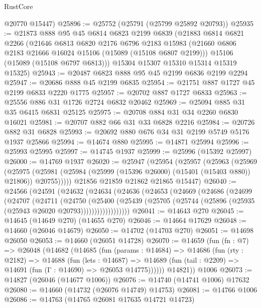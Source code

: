 \begin{lexlean}{RustCore}
\begin{coremodule}
      @20770
      @15447)
@25896 := @25752 (@25791 (@25799 @25892 @20793))
@25935 := @21873
    @888
    @95
    @45
    @6814
    @6823
    @2199
    @6839
    (@21883
      @6814
      @6821
      @2266
      (@21646
        @6813
        @6820
        @2176
        @6796
        @2183
        @15983
        (@21660 @6806 @2183 @21666 @16024 @15106 (@15089 (@15108 @6807 @2199)))
        @15106
        (@15089 (@15108 @6797 @6813)))
      @15304
      @15307
      @15310
      @15314
      @15319
      @15325)
@25943 := @20487 @6823 @888 @95 @45 @2199 @6836 @2199 @2294
@25947 := @20686 @888 @45 @2199 @6835
@25954 := @21751 @887 @1727 @45 @2199 @6833 @2220 @1775
@25957 := @20702 @887 @1727 @6833
@25963 := @25556 @886 @31 @1726 @2724 @6832 @20462
@25969 := @25094 @885 @31 @35 @6415 @6831 @25125
@25975 := @20708 @884 @31 @34 @2260 @6830 @16021
@25981 := @20707 @882 @66 @31 @33 @6828 @2216
@25984 := @20726 @882 @31 @6828
@25993 := @20692 @880 @676 @34 @31 @2199 @5749 @5176 @1937 @25866
@25994 := @14674 @880
@25995 := @14871 @25994
@25996 := @25993 @25995
@25997 := @14745 @1937
@25999 := @25996 (@15392 @25997)
@26000 := @14769 @1937
@26020 := @25947
    (@25954
      (@25957
        (@25963
          (@25969
            (@25975
              (@25981 (@25984 (@25999 (@15396 @26000) (@15401 (@15403 @880)) @21806)) @20755)))))
      @21856
      @21859
      @21862
      @21865
      @15447)
@26040 := @24566
    (@24591
      (@24632
        (@24634
          (@24636
            (@24653
              (@24669
                (@24686
                  (@24699
                    (@24707
                      (@24711
                        (@24750
                          (@25400
                            (@25439
                              (@25705
                                (@25744 (@25896 (@25935 (@25943 @26020 @20793))))))))))))))))))
@26041 := @14643 @270
@26045 := @14645 (@14649 @270) (@14655 @270)
@26046 := @14664 @17629
@26048 := @14660 (@26046 @14679)
@26050 := @14702 (@14703 @270)
@26051 := @14698 @26050
@26053 := @14660 (@26051 @14728)
@26070 := @14659
    (fun (fn : @7) =>
    @26048
      (@14682
        (@14685
          (fun (params : @14684) =>
          @14686
            (fun (rty : @2182) =>
            @14688
              (fun (lets : @14687) =>
              @14689 (fun (tail : @2209) => @14691 (fun (Γ : @14690) => @26053 @14775))))))
        @14821))
    @1006
@26073 := @14827 (@26046 (@14677 @1006))
@26076 := @14740 (@14741 @1006) @17632
@26080 := @14660 (@14732 (@26076 @14749) @14753)
@26081 := @14766 @1006
@26086 := @14763 (@14765 @26081 @17635 @14721 @14723)

\end{coremodule}
\end{lexlean}
